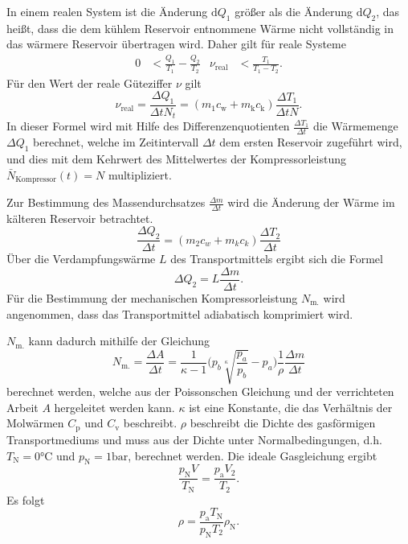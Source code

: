 In einem realen System ist die Änderung $\mathup{d}Q_1$ größer als die Änderung $\mathup{d}Q_2$, das heißt, dass die dem kühlem Reservoir entnommene Wärme nicht vollständig in das wärmere Reservoir übertragen wird.
Daher gilt für reale Systeme
\begin{align}
	 0 &< \frac{Q_1}{T_1}-\frac{Q_2}{T_2} & \nu_{\text{real}} &< \frac{T_1}{T_1-T_2}.
\end{align}
Für den Wert der reale Güteziffer $\nu$ gilt
\begin{equation}
	\nu_\mathup{real}=\frac{\Delta{Q_1}}{{\Delta{t}}N_t}=(m_1c_\mathup{w}+m_\mathup{k}c_\mathup{k})\frac{\Delta{T_1}}{{\Delta{t}}N}.
	\label{waermemenge/zeitintervall}
\end{equation}
In dieser Formel wird mit Hilfe des Differenzenquotienten $\frac{\Delta{T_1}}{\Delta{t}}$ die Wärmemenge $\Delta{Q_1}$ berechnet, 
welche im Zeitintervall $\Delta{t}$ dem ersten Reservoir zugeführt wird, 
und dies mit dem Kehrwert des Mittelwertes der Kompressorleistung $\bar{N}_\text{Kompressor}(t) = N$ multipliziert.

Zur Bestimmung des Massendurchsatzes $\frac{\Delta{m}}{\Delta{t}}$ wird die Änderung der Wärme im kälteren Reservoir betrachtet.
\begin{equation}
	\frac{\Delta Q_2}{\Delta t} =(m_2 c_w + m_k c_k)\frac{\Delta T_2}{\Delta t}
\label{eq:q2-t-verhaeltnis}
\end{equation}
Über die Verdampfungswärme $L$ des Transportmittels ergibt sich die Formel
\begin{equation}
	\Delta Q_2 =L\frac{\Delta m} {\Delta t}.
\label{eq:verdampfungswaerme}	
\end{equation}
Für die Bestimmung der mechanischen Kompressorleistung $N_\text{m.}$ wird angenommen, dass das Transportmittel adiabatisch komprimiert wird. 

$N_\text{m.}$ kann dadurch mithilfe der Gleichung
\begin{equation}
	N_\mathup{m.}=\frac{\Delta{A}}{\Delta{t}}=\frac{1}{\kappa-1}\biggl(p_b \sqrt[\kappa]{\frac{p_a}{p_b}}-p_a\biggr)\frac{1}{\rho}\frac{\Delta{m}}{\Delta{t}}
\label{eq:kompressorleistung}
\end{equation}
berechnet werden, welche aus der Poissonschen Gleichung und der verrichteten Arbeit $A$ hergeleitet werden kann. 
$\kappa$ ist eine Konstante, die das Verhältnis der Molwärmen $C_\mathup{p}$ und $C_\mathup{v}$ beschreibt. 
$\rho$ beschreibt die Dichte des gasförmigen Transportmediums und muss aus der Dichte unter Normalbedingungen, d.h. $T_\mathup{N}=0\si{\celsius}$ und $p_\mathup{N}=1\si{\bar}$, berechnet werden. 
Die ideale Gasgleichung ergibt
\begin{equation}
	\frac{p_\mathup{N} V}{T_\mathup{N}}=\frac{p_\mathup{a} V_2}{T_2}.
\end{equation}
Es folgt
\begin{equation}
	\rho=\frac{p_\mathup{a}T_\mathup{N}}{p_\mathup{N}T_2}\rho_\mathup{N}.
\label{eq:transportmediumdichte}
\end{equation}
